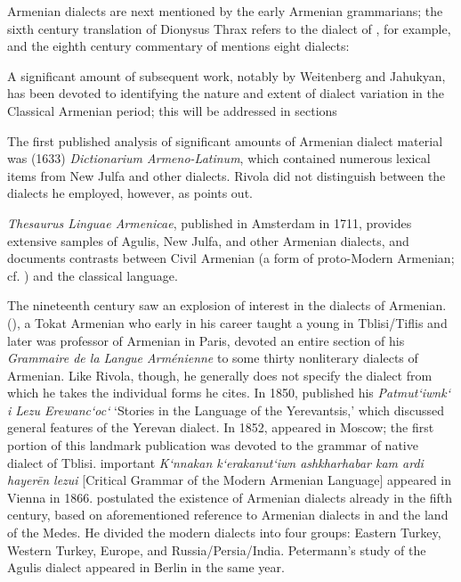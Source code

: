 Armenian dialects are next mentioned by the early Armenian grammarians; the sixth century translation of Dionysus Thrax refers to the dialect of , for example, and the eighth century commentary of  mentions eight dialects: 


A significant amount of subsequent work, notably by Weitenberg and Jahukyan, has been devoted to identifying the nature and extent of dialect variation in the Classical Armenian period; this will be addressed in sections 



The first published analysis of significant amounts of Armenian dialect material was  (1633) \textit{Dictionarium Armeno-Latinum}, which contained numerous lexical items from New Julfa and other dialects. Rivola did not distinguish between the dialects he employed, however, as  points out.	

 \textit{Thesaurus Linguae Armenicae}, published in Amsterdam in 1711, provides extensive samples of Agulis, New Julfa, and other Armenian dialects, and documents contrasts between Civil Armenian (a form of proto-Modern Armenian; cf. ) and the classical language. 


	


The nineteenth century saw an explosion of interest in the dialects of Armenian.  (), a Tokat Armenian who early in his career taught a young  in Tblisi/Tiflis and later was professor of Armenian in Paris, devoted an entire section of his  \textit{Grammaire de la Langue Arménienne} to some thirty nonliterary dialects of Armenian. Like Rivola, though, he generally does not specify the dialect from which he takes the individual forms he cites. In 1850,  published his \textit{Patmut‘iwnk‘ i Lezu Erewanc‘oc‘} `Stories in the Language of the Yerevantsis,'  which discussed general features of the Yerevan dialect. In 1852,  appeared in Moscow; the first portion of this landmark publication was devoted to the grammar of  native dialect of Tblisi.  important \textit{K‘nnakan k‘erakanut‘iwn ashkharhabar kam ardi hayerēn lezui} [Critical Grammar of the Modern Armenian Language] appeared in Vienna in 1866.  postulated the existence of Armenian dialects already in the fifth century, based on  aforementioned reference to Armenian dialects in  and the land of the Medes. He divided the modern dialects into four groups: Eastern Turkey, Western Turkey, Europe, and Russia/Persia/India. Petermann’s study of the Agulis dialect appeared in Berlin in the same year.	

